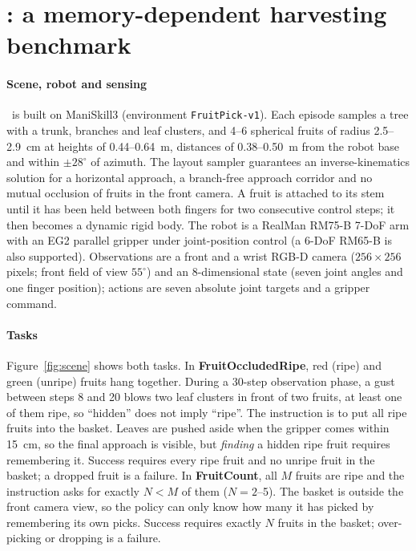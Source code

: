 \section{\bench: a memory-dependent harvesting benchmark}
\label{sec:benchmark}

\paragraph{Scene, robot and sensing} \bench\ is built on ManiSkill3 \citep{tao2025maniskill3} (environment \texttt{FruitPick-v1}). Each episode samples a tree with a trunk, branches and leaf clusters, and 4--6 spherical fruits of radius 2.5--2.9~cm at heights of 0.44--0.64~m, distances of 0.38--0.50~m from the robot base and within $\pm 28^\circ$ of azimuth. The layout sampler guarantees an inverse-kinematics solution for a horizontal approach, a branch-free approach corridor and no mutual occlusion of fruits in the front camera. A fruit is attached to its stem until it has been held between both fingers for two consecutive control steps; it then becomes a dynamic rigid body. The robot is a RealMan RM75-B 7-DoF arm with an EG2 parallel gripper under joint-position control (a 6-DoF RM65-B is also supported). Observations are a front and a wrist RGB-D camera ($256\times256$ pixels; front field of view $55^\circ$) and an 8-dimensional state (seven joint angles and one finger position); actions are seven absolute joint targets and a gripper command.

\paragraph{Tasks}
\label{sec:tasks}
Figure~\ref{fig:scene} shows both tasks. In \textbf{FruitOccludedRipe}, red (ripe) and green (unripe) fruits hang together. During a 30-step observation phase, a gust between steps 8 and 20 blows two leaf clusters in front of two fruits, at least one of them ripe, so ``hidden'' does not imply ``ripe''. The instruction is to put all ripe fruits into the basket. Leaves are pushed aside when the gripper comes within 15~cm, so the final approach is visible, but \emph{finding} a hidden ripe fruit requires remembering it. Success requires every ripe fruit and no unripe fruit in the basket; a dropped fruit is a failure. In \textbf{FruitCount}, all $M$ fruits are ripe and the instruction asks for exactly $N<M$ of them ($N=2$--5). The basket is outside the front camera view, so the policy can only know how many it has picked by remembering its own picks. Success requires exactly $N$ fruits in the basket; over-picking or dropping is a failure.

